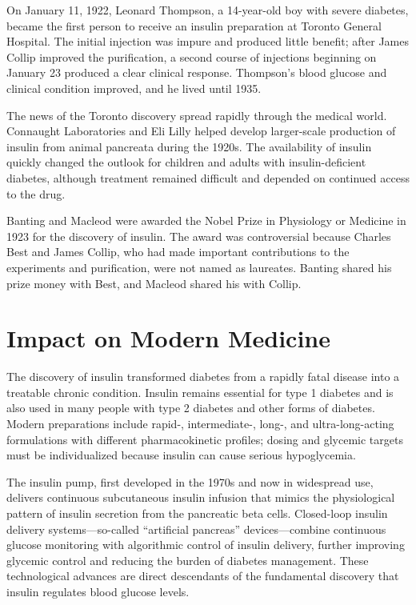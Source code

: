 On January 11, 1922, Leonard Thompson, a 14-year-old boy with severe diabetes, became the first person to receive an insulin preparation at Toronto General Hospital. The initial injection was impure and produced little benefit; after James Collip improved the purification, a second course of injections beginning on January 23 produced a clear clinical response. Thompson's blood glucose and clinical condition improved, and he lived until 1935.\cite{lecture-1923,insulin-history}

The news of the Toronto discovery spread rapidly through the medical world. Connaught Laboratories and Eli Lilly helped develop larger-scale production of insulin from animal pancreata during the 1920s. The availability of insulin quickly changed the outlook for children and adults with insulin-deficient diabetes, although treatment remained difficult and depended on continued access to the drug.\cite{insulin-history}

Banting and Macleod were awarded the Nobel Prize in Physiology or Medicine in 1923 for the discovery of insulin. The award was controversial because Charles Best and James Collip, who had made important contributions to the experiments and purification, were not named as laureates. Banting shared his prize money with Best, and Macleod shared his with Collip.\cite{nobel-1923,insulin-history}

\section{Impact on Modern Medicine}

The discovery of insulin transformed diabetes from a rapidly fatal disease into a treatable chronic condition. Insulin remains essential for type 1 diabetes and is also used in many people with type 2 diabetes and other forms of diabetes. Modern preparations include rapid-, intermediate-, long-, and ultra-long-acting formulations with different pharmacokinetic profiles; dosing and glycemic targets must be individualized because insulin can cause serious hypoglycemia.\cite{insulin-modern}

The insulin pump, first developed in the 1970s and now in widespread use, delivers continuous subcutaneous insulin infusion that mimics the physiological pattern of insulin secretion from the pancreatic beta cells. Closed-loop insulin delivery systems---so-called ``artificial pancreas'' devices---combine continuous glucose monitoring with algorithmic control of insulin delivery, further improving glycemic control and reducing the burden of diabetes management. These technological advances are direct descendants of the fundamental discovery that insulin regulates blood glucose levels.

